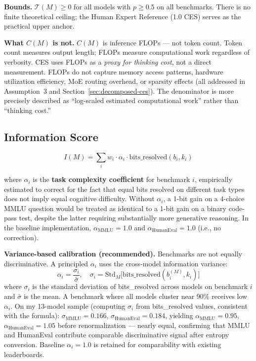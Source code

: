 \documentclass[12pt]{article}
\begin{document}
\noindent\textbf{Bounds.} $\mathcal{T}(M) \geq 0$ for all models with $p \geq 0.5$ on all benchmarks. There is no finite theoretical ceiling; the Human Expert Reference (1.0 CES) serves as the practical upper anchor.

\noindent\textbf{What $C(M)$ is not.} $C(M)$ is inference FLOPs --- not token count. Token count measures output length; FLOPs measure computational work regardless of verbosity. CES uses FLOPs as a \textit{proxy for thinking cost}, not a direct measurement. FLOPs do not capture memory access patterns, hardware utilization efficiency, MoE routing overhead, or sparsity effects (all addressed in Assumption~3 and Section~\ref{sec:decomposed-ces}). The denominator is more precisely described as ``log-scaled estimated computational work'' rather than ``thinking cost.''

\subsection{Information Score}

\begin{equation}
I(M) = \sum_{i} w_i \cdot \alpha_i \cdot \text{bits\_resolved}(b_i, k_i)
\end{equation}

where $\alpha_i$ is the \textbf{task complexity coefficient} for benchmark $i$, empirically estimated to correct for the fact that equal bits resolved on different task types does not imply equal cognitive difficulty. Without $\alpha_i$, a 1-bit gain on a 4-choice MMLU question would be treated as identical to a 1-bit gain on a binary code-pass test, despite the latter requiring substantially more generative reasoning. In the baseline implementation, $\alpha_{\text{MMLU}} = 1.0$ and $\alpha_{\text{HumanEval}} = 1.0$ (i.e., no correction).

\noindent\textbf{Variance-based calibration (recommended).} Benchmarks are not equally discriminative. A principled $\alpha_i$ uses the cross-model information variance:
\begin{equation}
\alpha_i = \frac{\sigma_i}{\bar{\sigma}}, \quad
\sigma_i = \mathrm{Std}_{M}\bigl[\mathrm{bits\_resolved}(b_i^{(M)}, k_i)\bigr]
\end{equation}
where $\sigma_i$ is the standard deviation of bits\_resolved across models on benchmark $i$ and $\bar{\sigma}$ is the mean. A benchmark where all models cluster near 90\% receives low $\alpha_i$. On my 13-model sample (computing $\sigma_i$ from bits\_resolved values, consistent with the formula): $\sigma_{\text{MMLU}} = 0.166$, $\sigma_{\text{HumanEval}} = 0.184$, yielding $\alpha_{\text{MMLU}} = 0.95$, $\alpha_{\text{HumanEval}} = 1.05$ before renormalization --- nearly equal, confirming that MMLU and HumanEval contribute comparable discriminative signal after entropy conversion. Baseline $\alpha_i = 1.0$ is retained for comparability with existing leaderboards.
\end{document}
